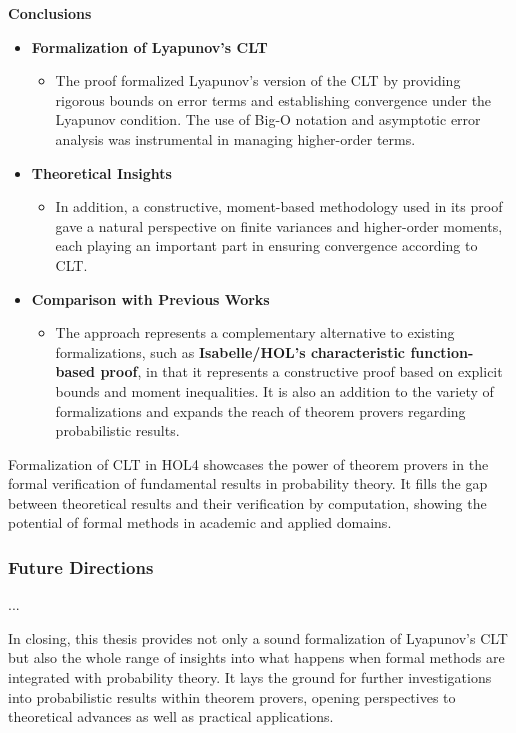 \textbf{Conclusions}
\begin{itemize}
    \item \textbf{Formalization of Lyapunov's CLT}
    \begin{itemize}
        \item The proof formalized Lyapunov's version of the CLT by providing rigorous bounds on error terms and establishing convergence under the Lyapunov condition. The use of Big-O notation and asymptotic error analysis was instrumental in managing higher-order terms.
    \end{itemize}

    \item \textbf{Theoretical Insights}
    \begin{itemize}
        \item In addition, a constructive, moment-based methodology used in its proof gave a natural perspective on finite variances and higher-order moments, each playing an important part in ensuring convergence according to CLT.
    \end{itemize}

    \item \textbf{Comparison with Previous Works}
    \begin{itemize}
        \item The approach represents a complementary alternative to existing formalizations, such as \textbf{Isabelle/HOL's characteristic function-based proof}, in that it represents a constructive proof based on explicit bounds and moment inequalities. It is also an addition to the variety of formalizations and expands the reach of theorem provers regarding probabilistic results.
    \end{itemize}

\end{itemize}
Formalization of CLT in HOL4 showcases the power of theorem provers in the formal verification of fundamental results in probability theory. It fills the gap between theoretical results and their verification by computation, showing the potential of formal methods in academic and applied domains.


\subsubsection{Future Directions}
...

In closing, this thesis provides not only a sound formalization of Lyapunov's CLT but also the whole range of insights into what happens when formal methods are integrated with probability theory. It lays the ground for further investigations into probabilistic results within theorem provers, opening perspectives to theoretical advances as well as practical applications.